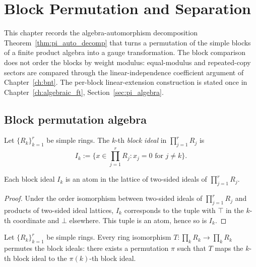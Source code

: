 
\chapter{Block Permutation and Separation}\label{ch:block_perm}

This chapter records the algebra-automorphism decomposition
Theorem~\ref{thm:pi_auto_decomp} that turns a permutation of the simple blocks of
a finite product algebra into a gauge transformation. The block comparison does
not order the blocks by weight modulus: equal-modulus and repeated-copy sectors
are compared through the linear-independence coefficient argument of
Chapter~\ref{ch:bnt}. The per-block linear-extension construction is stated once
in Chapter~\ref{ch:algebraic_ft}, Section~\ref{sec:pi_algebra}.

\section{Block permutation algebra}

\begin{definition}\label{def:block_ideal}
    \leanok
    Let $\{R_k\}_{k=1}^r$ be simple rings.
    The $k$-th \emph{block ideal} in $\prod_{j=1}^r R_j$ is
    \[
        I_k := \{x \in \prod_{j=1}^r R_j : x_j = 0 \text{ for } j \neq k\}.
    \]
\end{definition}

\begin{theorem}\label{thm:block_ideal_atom}
    \leanok
    Each block ideal $I_k$ is an atom in the lattice of two-sided ideals of
    $\prod_{j=1}^r R_j$.
\end{theorem}

\begin{proof}
    \leanok
    Under the order isomorphism between two-sided ideals of $\prod_{j=1}^r R_j$
    and products of two-sided ideal lattices, $I_k$ corresponds to the tuple with
    $\top$ in the $k$-th coordinate and $\bot$ elsewhere. This tuple is an atom,
    hence so is $I_k$.
\end{proof}

\begin{theorem}\label{thm:ring_perm}
    \leanok
    Let $\{R_k\}_{k=1}^r$ be simple rings.
    Every ring isomorphism $T : \prod_k R_k \to \prod_k R_k$
    permutes the block ideals:
    there exists a permutation $\pi$ such that
    $T$ maps the $k$-th block ideal to the $\pi(k)$-th block ideal.
\end{theorem}


